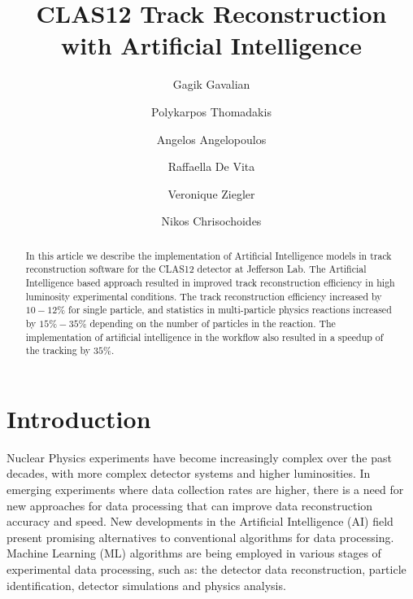 \documentclass[aps,prl,preprint,12pt]{revtex4}
\begin{document}
\begin{CJK*}{GB}{}
\title{CLAS12 Track Reconstruction with Artificial Intelligence}

\author{Gagik Gavalian}
\author{Polykarpos Thomadakis}
\author{Angelos Angelopoulos}
\author{Raffaella De Vita}
\author{Veronique Ziegler}
\author{Nikos Chrisochoides}

\begin{abstract}
  In this article we describe the implementation of Artificial Intelligence models in track reconstruction
  software for the CLAS12 detector at Jefferson Lab. The Artificial Intelligence based approach resulted 
  in improved track reconstruction efficiency in high luminosity experimental conditions.  The track
 reconstruction efficiency increased by $10-12\%$ for single particle, and statistics in multi-particle physics 
 reactions increased by $15\%-35\%$ depending on the number of particles in the reaction. The implementation 
 of artificial intelligence in the workflow also resulted in a speedup of the tracking by $35\%$. 
\end{abstract}

\maketitle
\end{CJK*}

\section{Introduction}
\indent

Nuclear Physics experiments have become increasingly complex over the past decades, with more complex detector 
systems and higher luminosities. In emerging experiments where data collection rates are higher, there is a need for 
new approaches for data processing that can improve data reconstruction accuracy and speed. New developments in 
the Artificial Intelligence (AI) field present promising alternatives to conventional algorithms for data processing. 
Machine Learning (ML) algorithms are being employed in various stages of experimental data processing, such as: 
the detector data reconstruction, particle identification, detector simulations and physics analysis. 
\end{document}
